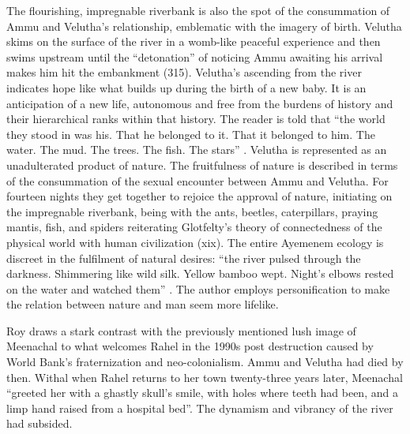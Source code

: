 The flourishing, impregnable riverbank is also the spot of the consummation of Ammu and Velutha's relationship, emblematic with the imagery of birth. Velutha skims on the surface of the river in a womb-like peaceful experience and then swims upstream until the ``detonation'' of noticing Ammu awaiting his arrival makes him hit the embankment (315). Velutha's ascending from the river indicates hope like what builds up during the birth of a new baby. It is an anticipation of a new life, autonomous and free from the burdens of history and their hierarchical ranks within that history. The reader is told that ``the world they stood in was his. That he belonged to it. That it belonged to him. The water. The mud. The trees. The fish. The stars'' \parencite[315-316]{Roy1997}.  Velutha is represented as an unadulterated product of nature. The fruitfulness of nature is described in terms of the consummation of the sexual encounter between Ammu and Velutha. For fourteen nights they get together to rejoice the approval of nature, initiating on the impregnable riverbank, being with the ants, beetles, caterpillars, praying mantis, fish, and spiders reiterating Glotfelty's theory of connectedness of the physical world with human civilization (xix). The entire Ayemenem ecology is discreet in the fulfilment of natural desires: ``the river pulsed through the darkness. Shimmering like wild silk. Yellow bamboo wept. Night's elbows rested on the water and watched them'' \parencite[317]{Roy1997}. The author employs personification to make the relation between nature and man seem more lifelike. 


Roy draws a stark contrast with the previously mentioned lush image of Meenachal to what welcomes Rahel in the 1990s post destruction caused by World Bank's fraternization and neo-colonialism. Ammu and Velutha had died by then. Withal when Rahel returns to her town twenty-three years later, Meenachal ``greeted her with a ghastly skull's smile, with holes where teeth had been, and a limp hand raised from a hospital bed''. \parencite[124]{Roy1997}  The dynamism and vibrancy of the river had subsided. 

